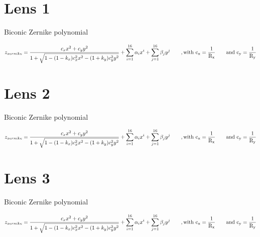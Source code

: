 \documentclass{article}
\begin{document}
\newcommand{\zernikeeq}{\begin{equation}
	z_{zernike} = \frac{c_x x^2 + c_y y^2}{1+ \sqrt{1-(1-k_x)c_x^2 x^2-(1+k_y)c_y^2y^2}} + \sum_{i=1}^{16} \alpha_i x^i + \sum_{j=1}^{16} \beta_j y^j \qquad \rm{,with\ }  c_x=\frac{1}{R_x} \qquad{and\ } c_y=\frac{1}{R_y}
\end{equation}
}


\section*{Lens 1}

\begin{table}[h]
\tiny
	
\end{table}
\begin{table}[h]
	\tiny
	
\end{table}
\begin{table}[h]
	\tiny
	
\end{table}


Biconic Zernike polynomial

\zernikeeq

\newpage
\section*{Lens 2}

\begin{table}[h]
	\tiny
	
\end{table}
\begin{table}[h]
	\tiny
	
\end{table}
\begin{table}[h]
	\tiny
	
\end{table}

Biconic Zernike polynomial

\zernikeeq


\newpage
\section*{Lens 3}
\begin{table}[h]
	\tiny
	
\end{table}
\begin{table}[h]
	\tiny
	
\end{table}
\begin{table}[h]
	\tiny
	
\end{table}

Biconic Zernike polynomial

\zernikeeq
\end{document}
